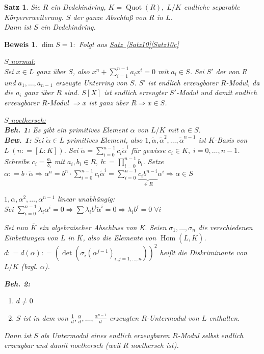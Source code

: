 \documentclass[a4paper,12pt]{scrbook}
\theoremstyle{break}
\newtheorem{Satz}{Satz}
\theoremstyle{nonumberbreak}
\newtheorem{Bew}{Beweis}
\theoremstyle{nonumberplain}
\newcommand{\defeqr}[0]{\mathrel{\mathop:}=}
\DeclareMathOperator{\Hom}{Hom}
\DeclareMathOperator{\Quot}{Quot}
\begin{document}
\begin{Satz} 
Sie $R$ ein Dedekindring, $K = \Quot(R), \; L/K$ endliche separable
Körpererweiterung.
$S$ der ganze Abschluß von $R$ in $L$.\\
Dann ist $S$ ein Dedekindring.
\end{Satz}

\begin{Bew} 
\underline{$\dim S=1:$} Folgt aus \hyperref[Satz10]{Satz~\ref*{Satz10}\ref*{Satz10c}}

\underline{$S$ normal:}\\
Sei $x\in L$ ganz über $S$, also $x^n+\sum_{i=1}^{n-1}a_i x^i = 0$ mit $a_i \in S$.
Sei $S'$ der von $R$ und $a_1,\dots,a_{n-1}$ erzeugte Unterring von $S$.
$S'$ ist endlich erzeugbarer $R$-Modul, da die $a_i$ ganz über $R$ sind.
$S[X]$ ist endlich erzeugter $S'$-Modul und damit endlich erzeugbarer $R$-Modul $\Rightarrow x$ ist ganz über $R \Rightarrow x \in S$.

\underline{$S$ noethersch:}\\
\textbf{Beh. 1:} Es gibt ein primitives Element $\alpha$ von $L/K$ mit $\alpha \in S$.\\
\textbf{Bew. 1:} Sei $\tilde{\alpha} \in L$ primitives Element, also $1, \tilde{\alpha}, \tilde{\alpha}^2, \dots, \tilde{\alpha}^{n-1}$ ist $K$-Basis von $L \; (n \defeqr [L:K])$.
Sei $\tilde{\alpha} = \sum_{i=0}^{n-1} c_i \tilde{\alpha}^i$ für gewisse $c_i \in K, \; i = 0, \dots, n-1$.
Schreibe $c_i = \frac{a_i}{b_i}$ mit $a_i, b_i \in R, \; b \defeqr \prod_{i=0}^{n-1} b_i$.
Setze $\alpha \defeqr b \cdot \tilde{\alpha} \Rightarrow \alpha^n = b^n \cdot
\sum_{i=0}^{n-1} c_i \tilde{\alpha}^i = \sum_{i=0}^{n-1} \underset{\in
R}{\underbrace{c_i b^{n-i}}}\alpha^i \Rightarrow \alpha \in S$

$1, \alpha, \alpha^2, \dots, \alpha^{n-1}$ linear unabhängig:\\
Sei $\sum_{i=0}^{n-1} \lambda_i \alpha^i = 0 \Rightarrow \sum \lambda_i b^i \tilde{\alpha}^i = 0 \Rightarrow \lambda_i b^i = 0 \; \forall i$

Sei nun $\bar{K}$ ein algebraischer Abschluss von K.
Seien $\sigma_1, \dots, \sigma_n$ die verschiedenen Einbettungen von $L$ in
$\bar{K}$, also die Elemente von $\Hom(L,\bar{K})$.\\
$d \defeqr d(\alpha) \defeqr (\det(\sigma_i(\alpha^{j-1})_{i,j=1, \dots, n}))^2$
heißt die Diskriminante von $L/K$ (bzgl. $\alpha$).

\textbf{Beh. 2:}
\vspace{-1.5ex}
\begin{enumerate} 
  \item $d \not= 0$
  \item $S$ ist in dem von $\frac{1}{d}, \frac{\alpha}{d}, \dots,
  \frac{\alpha^{n-1}}{d}$ erzeugten $R$-Untermodul von $L$ enthalten.
\end{enumerate}
Dann ist $S$ als Untermodul eines endlich erzeugbaren $R$-Modul selbst endlich
erzeugbar und damit noethersch (weil $R$ noethersch ist).


\end{Bew}
\end{document}
